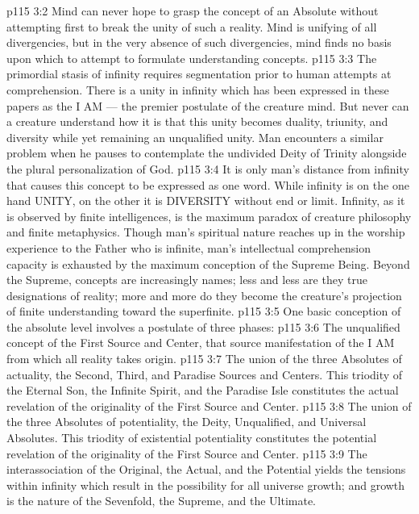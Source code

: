 \vs p115 3:2 Mind can never hope to grasp the concept of an Absolute without attempting first to break the unity of such a reality. Mind is unifying of all divergencies, but in the very absence of such divergencies, mind finds no basis upon which to attempt to formulate understanding concepts.
\vs p115 3:3 The primordial stasis of infinity requires segmentation prior to human attempts at comprehension. There is a unity in infinity which has been expressed in these papers as the I AM --- the premier postulate of the creature mind. But never can a creature understand how it is that this unity becomes duality, triunity, and diversity while yet remaining an unqualified unity. Man encounters a similar problem when he pauses to contemplate the undivided Deity of Trinity alongside the plural personalization of God.
\vs p115 3:4 It is only man’s distance from infinity that causes this concept to be expressed as one word. While infinity is on the one hand UNITY, on the other it is DIVERSITY without end or limit. Infinity, as it is observed by finite intelligences, is the maximum paradox of creature philosophy and finite metaphysics. Though man’s spiritual nature reaches up in the worship experience to the Father who is infinite, man’s intellectual comprehension capacity is exhausted by the maximum conception of the Supreme Being. Beyond the Supreme, concepts are increasingly names; less and less are they true designations of reality; more and more do they become the creature’s projection of finite understanding toward the superfinite.
\vs p115 3:5 \pc One basic conception of the absolute level involves a postulate of three phases:
\vs p115 3:6 \bibnobreakspace {} The unqualified concept of the First Source and Center, that source manifestation of the I AM from which all reality takes origin.
\vs p115 3:7 \pc {}\bibnobreakspace {} The union of the three Absolutes of actuality, the Second, Third, and Paradise Sources and Centers. This triodity of the Eternal Son, the Infinite Spirit, and the Paradise Isle constitutes the actual revelation of the originality of the First Source and Center.
\vs p115 3:8 \pc {}\bibnobreakspace {} The union of the three Absolutes of potentiality, the Deity, Unqualified, and Universal Absolutes. This triodity of existential potentiality constitutes the potential revelation of the originality of the First Source and Center.
\vs p115 3:9 \pc The interassociation of the Original, the Actual, and the Potential yields the tensions within infinity which result in the possibility for all universe growth; and growth is the nature of the Sevenfold, the Supreme, and the Ultimate.
